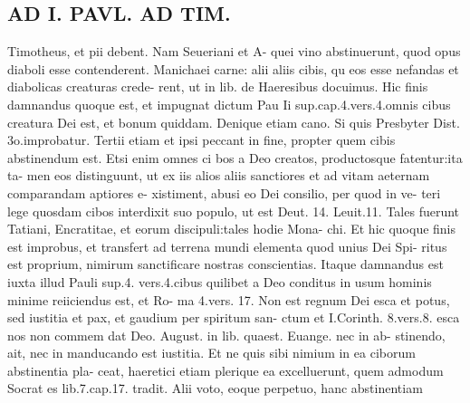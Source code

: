 \documentclass{article}
\begin{document}
\begin{pages}
\section*{AD I. PAVL. AD TIM. }
\marginpar{[ p.374 ]}Timotheus, et pii debent. Nam Seueriani et A- quei vino abstinuerunt, quod opus diaboli esse contenderent. Manichaei carne: alii aliis cibis, qu eos esse nefandas et diabolicas creaturas crede- rent, ut in lib. de Haeresibus docuimus. Hic finis damnandus quoque est, et impugnat dictum Pau Ii sup.cap.4.vers.4.omnis cibus creatura Dei est, et bonum quiddam. Denique etiam cano. Si quis Presbyter Dist. 3o.improbatur. Tertii etiam et ipsi peccant in fine, propter quem cibis abstinendum est. Etsi enim omnes ci bos a Deo creatos, productosque fatentur:ita ta- men eos distinguunt, ut ex iis alios aliis sanctiores et ad vitam aeternam comparandam aptiores e- xistiment, abusi eo Dei consilio, per quod in ve- teri lege quosdam cibos interdixit suo populo, ut est Deut. 14. Leuit.11. Tales fuerunt Tatiani, Encratitae, et eorum discipuli:tales hodie Mona- chi. Et hic quoque finis est improbus, et transfert ad terrena mundi elementa quod unius Dei Spi- ritus est proprium, nimirum sanctificare nostras conscientias. Itaque damnandus est iuxta illud Pauli sup.4. vers.4.cibus quilibet a Deo conditus in usum hominis minime reiiciendus est, et Ro- ma 4.vers. 17. Non est regnum Dei esca et potus, sed iustitia et pax, et gaudium per spiritum san- ctum et I.Corinth. 8.vers.8. esca nos non commem dat Deo. August. in lib. quaest. Euange. nec in ab- stinendo, ait, nec in manducando est iustitia. Et ne quis sibi nimium in ea ciborum abstinentia pla- ceat, haeretici etiam plerique ea excelluerunt, quem admodum Socrat es lib.7.cap.17. tradit. Alii voto, eoque perpetuo, hanc abstinentiam 

\end{pages}
\end{document}
